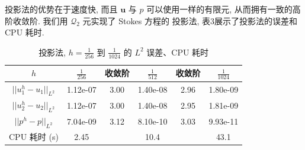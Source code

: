 \documentclass[lang=cn,11pt,a4paper]{elegantpaper}
\begin{document}
投影法的优势在于速度快, 而且 $\mathbf{u}$ 与 $p$ 可以使用一样的有限元, 
从而拥有一致的高阶收敛阶. 我们用 $\mathcal{Q}_2$ 元实现了 Stokes 方程的
投影法, 表3展示了投影法的误差和 CPU 耗时.
\begin{table}[H]
    \centering
    \begin{tabular}{cccccc}
    \hline
         $h$               & $\frac{1}{256}$ & 收敛阶  & $\frac{1}{512}$ & 收敛阶  & $\frac{1}{1024}$ \\ \hline
         $||u_1^h-u_1||_{L^2}$ & 1.12e-07        & 3.00 & 1.40e-08        & 2.96 & 1.80e-09         \\
         $||u_2^h-u_2||_{L^2}$ & 1.12e-07        & 3.00 & 1.40e-08        & 2.95 & 1.81e-09         \\
         $||p^h-p||_{L^2}$     & 7.04e-09        & 3.12 & 8.10e-10        & 3.03 & 9.93e-11         \\
         CPU 耗时 (s)          & 2.45        &    & 10.4        &  & 43.1         \\ \hline
    \end{tabular}
    \caption{\small 投影法, $h=\frac{1}{256}$ 到 $\frac{1}{1024}$ 的 $L^2$ 误差、CPU 耗时}
\end{table}

\appendix
\addappheadtotoc
\end{document}
